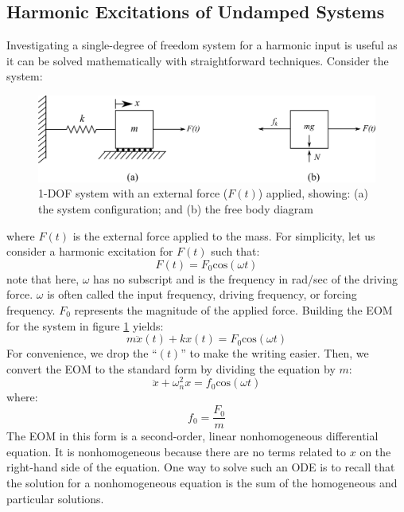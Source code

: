 \documentclass[12pt,letter]{article}
\begin{document}
\subsection{Harmonic Excitations of Undamped Systems}


	Investigating a single-degree of freedom system for a harmonic input is useful as it can be solved mathematically with straightforward techniques. Consider the system:
	\begin{figure}[H]
		\centering
		\includegraphics[]{../figures/1-DOF-spring_mass_horizontal_forced_FBD.png}
		\caption{1-DOF system with an external force ($F(t)$) applied, showing: (a) the system configuration; and (b) the free body diagram}
		\label{fig:1-DOF-spring_mass_horizontal_forced_FBD}
	\end{figure}	
	\noindent where $F(t)$ is the external force applied to the mass. For simplicity, let us consider a harmonic excitation for $F(t)$ such that:
	\begin{equation}
		F(t) = F_0\text{cos}(\omega t)
	\end{equation}							
	note that here, $\omega$ has no subscript and is the frequency in rad/sec of the driving force. $\omega$ is often called the input frequency, driving frequency, or forcing frequency. $F_0$ represents the magnitude of the applied force.  Building the EOM for the system in figure \ref{fig:1-DOF-spring_mass_horizontal_forced_FBD} yields:
	\begin{equation}
		m \ddot{x}(t)+kx(t) = F_0\text{cos}(\omega t)
	\end{equation}			
	For convenience, we drop the ``$(t)$'' to make the writing easier. Then, we convert the EOM to the standard form by dividing the equation by $m$:					
	\begin{equation}
		\ddot{x}+\omega_n^2x = f_0\text{cos}(\omega t)
	\end{equation}					
	where:
	\begin{equation}
		f_0 = \frac{F_0}{m}
	\end{equation}	
	The EOM in this form is a second-order, linear nonhomogeneous differential equation. It is nonhomogeneous because there are no terms related to $x$ on the right-hand side of the equation. One way to solve such an ODE is to recall that the solution for a nonhomogeneous equation is the sum of the homogeneous and particular solutions. 
\end{document}
